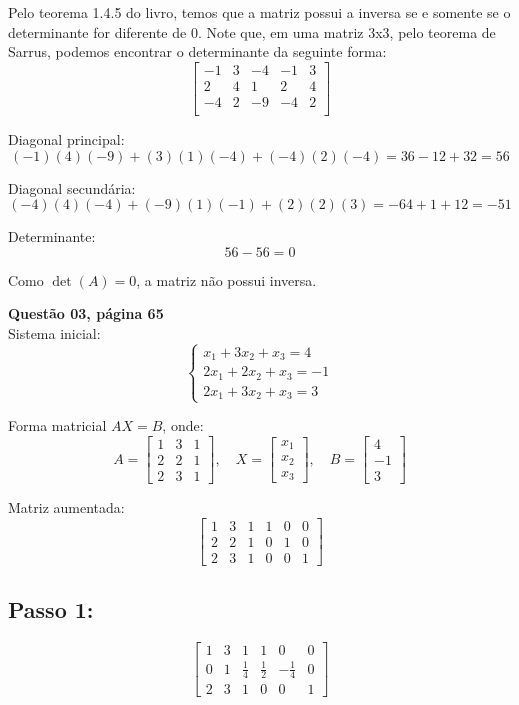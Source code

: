 \documentclass[a4paper,12pt]{article}
\newcommand{\seta}[3][-0.05cm]{%
  \stackon[#1]{
    $\xrightarrow{\mathmakebox[\setawidth]{}}$}{
    \scriptsize{$#2 \,\leftarrow\, #3$}
    }
}
\newlength{\setawidth}%
\begin{document}
Pelo teorema 1.4.5 do livro, temos que a matriz possui a inversa se e somente se o determinante for diferente de 0. Note que, em uma matriz 3x3, pelo teorema de Sarrus, podemos encontrar o determinante da seguinte forma:
\\

\[
\left[
\begin{array}{cccccc}
-1 & 3 & -4 & -1 & 3 \\
2 & 4 & 1 & 2 & 4 \\
-4 & 2 & -9 & -4 & 2 \\
\end{array}
\right]
\]

Diagonal principal:
\[
(-1)(4)(-9) + (3)(1)(-4) + (-4)(2)(-4) = 36 - 12 + 32 = 56
\]

Diagonal secundária:
\[
(-4)(4)(-4) + (-9)(1)(-1) + (2)(2)(3) = -64 + 1 + 12 = -51
\]

Determinante:
\[
56 - 56 = 0
\]

Como $\det(A) = 0$, a matriz não possui inversa.
\[\] 

\textbf{Questão 03, página 65}\\
Sistema inicial:
\[
\begin{cases}
x_1 + 3x_2 + x_3 = 4 \\
2x_1 + 2x_2 + x_3 = -1 \\
2x_1 + 3x_2 + x_3 = 3
\end{cases}
\]

Forma matricial $AX = B$, onde:
\[
A = 
\begin{bmatrix}
1 & 3 & 1 \\
2 & 2 & 1 \\
2 & 3 & 1
\end{bmatrix}, \quad
X = 
\begin{bmatrix}
x_1 \\ x_2 \\ x_3
\end{bmatrix}, \quad
B = 
\begin{bmatrix}
4 \\ -1 \\ 3
\end{bmatrix}
\]

Matriz aumentada:
\[
\left[
\begin{array}{ccc|ccc}
1 & 3 & 1 & 1 & 0 & 0 \\
2 & 2 & 1 & 0 & 1 & 0 \\
2 & 3 & 1 & 0 & 0 & 1
\end{array}
\right]
\]

\subsection*{Passo 1: \seta{L_2}{\frac{L_2 - 2L_1}{-4}}}
\[
\left[
\begin{array}{ccc|ccc}
1 & 3 & 1 & 1 & 0 & 0 \\
0 & 1 & \tfrac{1}{4} & \tfrac{1}{2} & -\tfrac{1}{4} & 0 \\
2 & 3 & 1 & 0 & 0 & 1
\end{array}
\right]
\]
\end{document}
